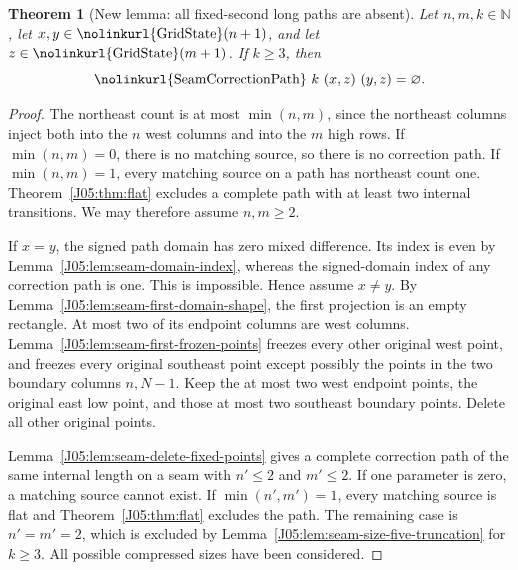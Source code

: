 \documentclass[11pt,oneside]{report}
\newtheorem{theorem}{Theorem}[section]
\theoremstyle{definition}
\numberwithin{equation}{section}
\newcommand{\decl}[1]{\textnormal{\nolinkurl{#1}}}
\begin{document}
\begin{theorem}[New lemma: all fixed-second long paths are absent]
\label{J05:thm:seam-first-long-empty}
Let $n,m,k\in\mathbb N$, let
$x,y\in\decl{GridState}(n+1)$, and let
$z\in\decl{GridState}(m+1)$. If $k\geq3$, then
\[
 \decl{SeamCorrectionPath}\ k\ (x,z)\ (y,z)=\varnothing.
\]
\end{theorem}
\begin{proof}
The northeast count is at most $\min(n,m)$, since the northeast
columns inject both into the $n$ west columns and into the $m$ high
rows. If $\min(n,m)=0$, there is no matching source, so there is no
correction path. If $\min(n,m)=1$, every matching source on a path
has northeast count one. Theorem~\ref{J05:thm:flat} excludes a complete
path with at least two internal transitions.
We may therefore assume $n,m\geq2$.

If $x=y$, the signed path domain has zero mixed difference.
Its index is even by Lemma~\ref{J05:lem:seam-domain-index}, whereas the
signed-domain index of any correction path is one.
This is impossible. Hence assume $x\ne y$.
By Lemma~\ref{J05:lem:seam-first-domain-shape}, the first projection is
an empty rectangle. At most two of its endpoint columns are west
columns. Lemma~\ref{J05:lem:seam-first-frozen-points} freezes every other
original west point, and freezes every original southeast point
except possibly the points in the two boundary columns $n,N-1$.
Keep the at most two west endpoint points, the original east low
point, and those at most two southeast boundary points.
Delete all other original points.

Lemma~\ref{J05:lem:seam-delete-fixed-points} gives a complete correction
path of the same internal length on a seam with $n'\leq2$ and
$m'\leq2$. If one parameter is zero, a matching source cannot exist.
If $\min(n',m')=1$, every matching source is flat and
Theorem~\ref{J05:thm:flat} excludes the path.
The remaining case is $n'=m'=2$, which is excluded by
Lemma~\ref{J05:lem:seam-size-five-truncation} for $k\geq3$.
All possible compressed sizes have been considered.
\end{proof}
\end{document}
